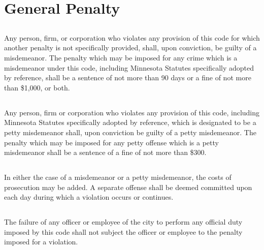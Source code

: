 \setcounter{section}{98}
\section{General Penalty}
\subsection{}
Any person, firm, or corporation who violates any provision of this code for which another penalty is not specifically provided, shall, upon conviction, be guilty of a misdemeanor.  The penalty which may be imposed for any crime which is a misdemeanor under this code, including Minnesota Statutes specifically adopted by reference, shall be a sentence of not more than 90 days or a fine of not more than \$1,000, or both.
\subsection{}
Any person, firm or corporation who violates any provision of this code, including Minnesota Statutes specifically adopted by reference, which is designated to be a petty misdemeanor shall, upon conviction be guilty of a petty misdemeanor.  The penalty which may be imposed for any petty offense which is a petty misdemeanor shall be a sentence of a fine of not more than \$300.
\subsection{}
In either the case of a misdemeanor or a petty misdemeanor, the costs of prosecution may be added.  A separate offense shall be deemed committed upon each day during which a violation occurs or continues.
\subsection{}
The failure of any officer or employee of the city to perform any official duty imposed by this code shall not subject the officer or employee to the penalty imposed for a violation.

